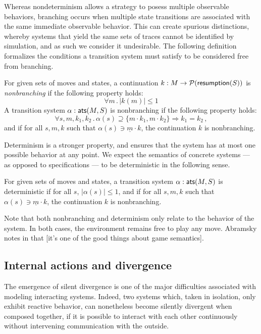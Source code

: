 Whereas nondeterminism allows a strategy to posess
multiple observable behaviors,
branching occurs when multiple state transitions
are associated with the same immediate observable behavior.
This can create spurious distinctions,
whereby systems that yield the same sets of traces
cannot be identified by simulation,
and as such we consider it undesirable.
The following definition
formalizes the conditions a transition system must satisfy
to be considered free from branching.

\begin{definition}
For given sets of moves and states,
a continuation $k : M \rightarrow \mathcal{P}( \mathsf{resumption} (S))$
is \emph{nonbranching} if the following property holds:
\[ \forall m \,.\, | k(m) | \le 1 \]
A transition system $\alpha :  \mathsf{ats} (M, S)$ is nonbranching
if the following property holds:
\[ \forall s, m, k_1, k_2 \,.\,
     \alpha(s) \supseteq \{ m \cdot k_1, m \cdot k_2 \} \Rightarrow
     k_1 = k_2 \,, \]
and if for all $s, m, k$ such that $\alpha(s) \ni \underline{m} \cdot k$,
the continuation $k$ is nonbranching.
\end{definition}

Determinism is a stronger property,
and ensures that the system has at most one possible behavior
at any point.
We expect the semantics of concrete systems ---
as opposed to specifications ---
to be deterministic in the following sense.

\begin{definition}
For given sets of moves and states,
a transition system $\alpha :  \mathsf{ats} (M, S)$
is deterministic if for all $s$, $|\alpha(s)| \le 1$,
and if for all $s, m, k$ such that $\alpha(s) \ni \underline{m} \cdot k$,
the continuation $k$ is nonbranching.
\end{definition}

Note that both nonbranching and determinism
only relate to the behavior of the system.
In both cases,
the environment remains free to play any move.
Abramsky notes in \cite{cspgs}
that [it's one of the good things about game semantics].

\subsection{Internal actions and divergence}

The emergence of silent divergence
is one of the major difficulties
associated with modeling interacting systems.
Indeed,
two systems which, taken in isolation,
only exhibit reactive behavior,
can nonetheless become silently divergent when composed together,
if it is possible to interact with each other continuously
without intervening communication with the outside.

